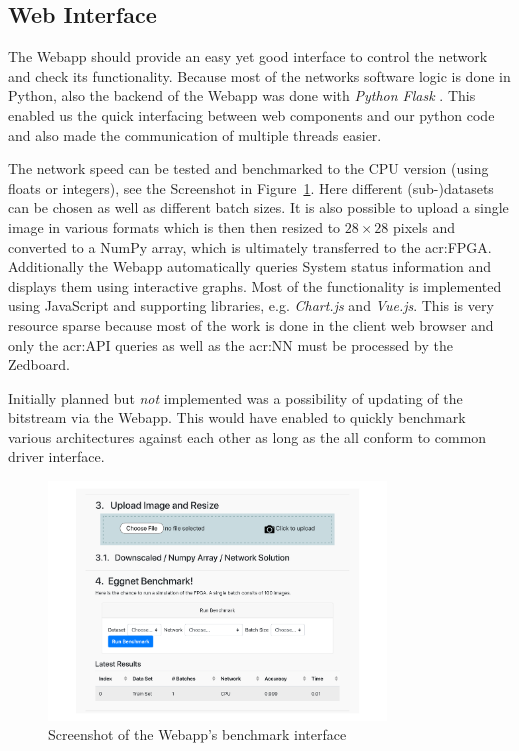 \subsection{Web Interface}

The Webapp should provide an easy yet good interface to control the network and check its functionality. Because most of the networks software logic is done in Python, also the backend of the Webapp was done with \emph{Python Flask} \cite{Pallets:2020aa}. This enabled us the quick interfacing between web components and our python code and also made the communication of multiple threads easier.

The network speed can be tested and benchmarked to the CPU version (using floats or integers), see the Screenshot in Figure~\ref{fig:sw-webapp-bench}. Here different (sub-)datasets can be chosen as well as different batch sizes. It is also possible to upload a single image in various formats which is then then resized to $28 \times 28$ pixels and converted to a NumPy array, which is ultimately transferred to the \gls{acr:FPGA}. Additionally the Webapp automatically queries System status information and displays them using interactive graphs. Most of the functionality is implemented using JavaScript and supporting libraries, e.g. \emph{Chart.js} and \emph{Vue.js}. This is very resource sparse because most of the work is done in the client web browser and only the \gls{acr:API} queries as well as the \gls{acr:NN} must be processed by the Zedboard.

Initially planned but \emph{not} implemented was a possibility of updating of the bitstream via the Webapp. This would have enabled to quickly benchmark various architectures against each other as long as the all conform to common driver interface.

\begin{figure}[hbtp]
  \centering
  \includegraphics[width=0.8\textwidth]{img/webapp_bench}
  \caption{Screenshot of the Webapp's benchmark interface}
  \label{fig:sw-webapp-bench}
\end{figure}


